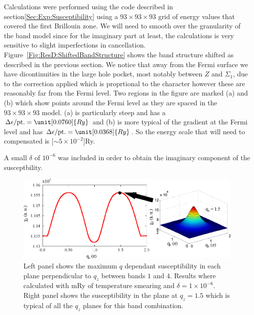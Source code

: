 Calculations were performed using the  code described in section\ref{Sec:Exp:Susceptibility} using a $93\times93\times93$ grid of energy values that covered the first Brillouin zone. We will need to smooth over the granularity of the \WIEN band model since for the imaginary part at least, the calculations is very sensitive to slight imperfections in cancellation. Figure~\ref{Fig:ResD:ShiftedBandStructure} shows the band structure shifted as described in the previous section. We notice that away from the Fermi surface we have dicontinuities in the large hole pocket, most notably between $Z$ and $\Sigma_1$, due to the correction applied which is proprtional to the \DzTwo character however these are reasonably far from the Fermi level. Two regions in the figure are marked (a) and (b) which show points around the Fermi level as they are spaced in the $93\times93\times93$ model. (a) is particularly steep and has a $\Delta \epsilon/\textrm{pt.} = \unit[0.0760]{Ry}$ and (b) is more typical of the gradient at the Fermi level and has $\Delta \epsilon/\textrm{pt.} = \unit[0.0368]{Ry}$. So the energy scale that will need to compensated is \unit[$\sim 5\times10^{-2}$]{Ry}.



A small $\delta$ of $10^{-6}$ was included in order to obtain the imaginary component of the susceptbility.

\begin{figure}[htbp]
    \begin{center}
        \includegraphics[scale=0.9]{Chapter-dHvABaFe2P2/Figures/AngleDepMeasurements/SusceptibilityEnhancement/SusceptibilityEnhancement}
        \caption{Left panel shows the maximum $q$ dependant susceptibility in each plane perpendicular to $q_z$ between bands $1$ and $4$. Results where calculated with \unit[1]{mRy} of temperature smearing and $\delta=1\times10^{-6}$. Right panel shows the susceptibility in the plane at $q_z=1.5$ which is typical of all the $q_z$ planes for this band combination.}
        \label{Fig:ResD:SusceptbilityEnhancement}
    \end{center}
\end{figure}

